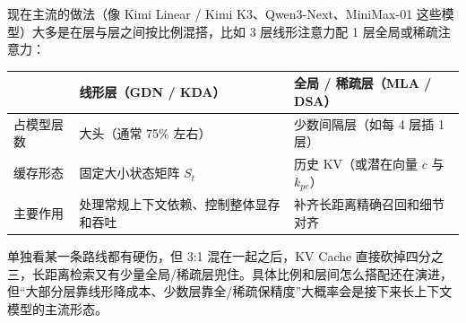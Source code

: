 \documentclass[11pt]{article}
\begin{document}
现在主流的做法（像 Kimi Linear / Kimi K3、Qwen3-Next、MiniMax-01 这些模型）大多是在层与层之间按比例混搭，比如 3 层线形注意力配 1 层全局或稀疏注意力：

\begin{table}[htbp]
  \centering
  \small
  \begin{tabular}{p{3.0cm}p{6.4cm}p{5.6cm}}
    \hline
    \textbf{} & \textbf{线形层（GDN / KDA）} & \textbf{全局 / 稀疏层（MLA / DSA）} \\
    \hline
    占模型层数 & 大头（通常 75\% 左右） & 少数间隔层（如每 4 层插 1 层） \\
    \hline
    缓存形态 & 固定大小状态矩阵 $S_t$ & 历史 KV（或潜在向量 $c$ 与 $k_{pe}$） \\
    \hline
    主要作用 & 处理常规上下文依赖、控制整体显存和吞吐 & 补齐长距离精确召回和细节对齐 \\
    \hline
  \end{tabular}
\end{table}

单独看某一条路线都有硬伤，但 3:1 混在一起之后，KV Cache 直接砍掉四分之三，长距离检索又有少量全局/稀疏层兜住。具体比例和层间怎么搭配还在演进，但“大部分层靠线形降成本、少数层靠全/稀疏保精度”大概率会是接下来长上下文模型的主流形态。
\end{document}
